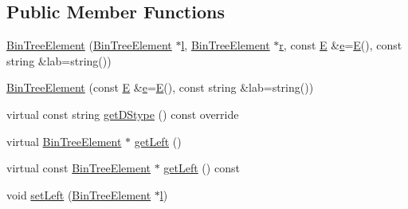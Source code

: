 \subsection*{Public Member Functions}
\begin{DoxyCompactItemize}
\item 
\mbox{\hyperlink{classbridges_1_1_bin_tree_element_a1c60db90bda9ecd3f5a61b5f33f49173}{Bin\+Tree\+Element}} (\mbox{\hyperlink{classbridges_1_1_bin_tree_element}{Bin\+Tree\+Element}} $\ast$\mbox{\hyperlink{namespacebridges_acfb0a4f7877d8f63de3e6862004c50eda2db95e8e1a9267b7a1188556b2013b33}{l}}, \mbox{\hyperlink{classbridges_1_1_bin_tree_element}{Bin\+Tree\+Element}} $\ast$\mbox{\hyperlink{namespacebridges_acfb0a4f7877d8f63de3e6862004c50eda4b43b0aee35624cd95b910189b3dc231}{r}}, const \mbox{\hyperlink{namespacebridges_acfb0a4f7877d8f63de3e6862004c50eda3a3ea00cfc35332cedf6e5e9a32e94da}{E}} \&\mbox{\hyperlink{namespacebridges_acfb0a4f7877d8f63de3e6862004c50edae1671797c52e15f763380b45e841ec32}{e}}=\mbox{\hyperlink{namespacebridges_acfb0a4f7877d8f63de3e6862004c50eda3a3ea00cfc35332cedf6e5e9a32e94da}{E}}(), const string \&lab=string())
\item 
\mbox{\hyperlink{classbridges_1_1_bin_tree_element_a37d12669e5bfe13ebf230dd8fd2a5816}{Bin\+Tree\+Element}} (const \mbox{\hyperlink{namespacebridges_acfb0a4f7877d8f63de3e6862004c50eda3a3ea00cfc35332cedf6e5e9a32e94da}{E}} \&\mbox{\hyperlink{namespacebridges_acfb0a4f7877d8f63de3e6862004c50edae1671797c52e15f763380b45e841ec32}{e}}=\mbox{\hyperlink{namespacebridges_acfb0a4f7877d8f63de3e6862004c50eda3a3ea00cfc35332cedf6e5e9a32e94da}{E}}(), const string \&lab=string())
\item 
virtual const string \mbox{\hyperlink{classbridges_1_1_bin_tree_element_a0a154f68ef0a58715e598a6ef92b9e59}{get\+D\+Stype}} () const override
\item 
virtual \mbox{\hyperlink{classbridges_1_1_bin_tree_element}{Bin\+Tree\+Element}} $\ast$ \mbox{\hyperlink{classbridges_1_1_bin_tree_element_a8367ce9c4eea814637edc2c56efbde25}{get\+Left}} ()
\item 
virtual const \mbox{\hyperlink{classbridges_1_1_bin_tree_element}{Bin\+Tree\+Element}} $\ast$ \mbox{\hyperlink{classbridges_1_1_bin_tree_element_a0841701bd7d4b444dafbbdfefed067a5}{get\+Left}} () const
\item 
void \mbox{\hyperlink{classbridges_1_1_bin_tree_element_a8f90f7f4c8da058ebfca64dd3728c50f}{set\+Left}} (\mbox{\hyperlink{classbridges_1_1_bin_tree_element}{Bin\+Tree\+Element}} $\ast$\mbox{\hyperlink{namespacebridges_acfb0a4f7877d8f63de3e6862004c50eda2db95e8e1a9267b7a1188556b2013b33}{l}})

\end{DoxyCompactItemize}
